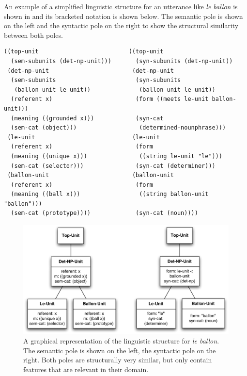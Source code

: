An example of a simplified linguistic structure for an utterance like
\textit{le ballon} is shown in  and its
bracketed notation is shown below. The semantic pole is shown on the
left and the syntactic pole on the right to show the structural
similarity between both poles.

\footnotesize
{}
\begin{lstlisting}
((top-unit                          ((top-unit
  (sem-subunits (det-np-unit)))       (syn-subunits (det-np-unit))
 (det-np-unit                        (det-np-unit
  (sem-subunits                       (syn-subunits 
   (ballon-unit le-unit))              (ballon-unit le-unit))
  (referent x)                        (form ((meets le-unit ballon-unit)))
  (meaning ((grounded x)))            (syn-cat 
  (sem-cat (object)))                  (determined-nounphrase)))
 (le-unit                            (le-unit 
  (referent x)                        (form 
  (meaning ((unique x)))               ((string le-unit "le")))
  (sem-cat (selector)))               (syn-cat (determiner)))
 (ballon-unit                        (ballon-unit 
  (referent x)                        (form 
  (meaning ((ball x)))                 ((string ballon-unit "ballon")))           
  (sem-cat (prototype))))             (syn-cat (noun))))
\end{lstlisting}
\normalsize

\begin{figure}[htbp]
  \begin{center}
    \includegraphics[width=.8\textwidth]{./frameworks/figures/cfs-le-ballon.pdf}
    \caption[Example coupled feature structure for \textit{le ballon}]{A
      graphical representation of the linguistic structure for \textit{le
      ballon}. The semantic pole is shown on the left, the syntactic
      pole on the right. Both poles are structurally very similar, but
      only contain features that are relevant in their domain.}
    \label{f:cfs-le-ballon}
  \end{center}
\end{figure}

